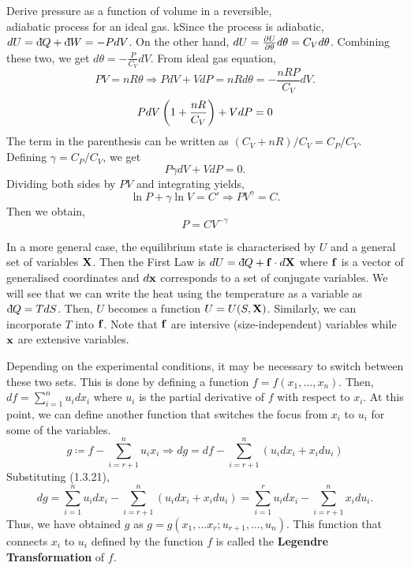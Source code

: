         \begin{problem}{Derive pressure as a function of volume in a reversible, \\adiabatic process for an ideal gas.}
            kSince the process is adiabatic, $dU = \text{d}\hspace*{-0.13em}\bar{}\hspace*{0.1em} Q + \text{d}\hspace*{-0.13em}\bar{}\hspace*{0.1em} W = -PdV$.
            On the other hand, $dU = \frac{\partial U}{\partial \theta}d\theta = C_Vd\theta$. Combining these two, we get $d\theta = - \frac{P}{C_V}dV$. From ideal gas equation,
            \begin{equation}
                PV = nR\theta \Rightarrow PdV + VdP = nRd\theta = -\frac{nRP}{C_V}dV.
            \end{equation}
            \begin{equation}
                PdV\left( 1+\frac{nR}{C_V} \right) + VdP = 0
            \end{equation}
            The term in the parenthesis can be written as $(C_V+nR)/C_V = C_P/C_V$. Defining $\gamma = C_P/C_V$, we get
            \begin{equation}
                P\gamma dV + VdP = 0.
            \end{equation}
            Dividing both sides by $PV$ and integrating yields,
            \begin{equation}
                \ln P + \gamma\ln V = C' \Rightarrow PV^\gamma = C.
            \end{equation}
            Then we obtain,
            \begin{equation}
                \boxed{P = CV^{-\gamma}}
            \end{equation}
        \end{problem}
    In a more general case, the equilibrium state is characterised by $U$ and a general set of variables $\mathbf{X}$. Then the First Law is $dU = \text{d}\hspace*{-0.13em}\bar{}\hspace*{0.1em} Q + \mathbf{f}\cdot d\mathbf{X}$ where $\mathbf{f}$ is a vector of generalised coordinates and $d\mathbf{x}$ corresponds to a set of conjugate variables. We will see that we can write the heat using the temperature as a variable as $\text{d}\hspace*{-0.13em}\bar{}\hspace*{0.1em} Q = TdS$. Then, $U$ becomes a function $U=U(S,\mathbf{X})$. Similarly, we can incorporate $T$ into $\mathbf{f}$. Note that $\mathbf{f}$ are intersive (size-independent) variables while $\mathbf{x}$ are extensive variables. 

    Depending on the experimental conditions, it may be necessary to switch between these two sets. This is done by defining a function $f=f(x_1,...,x_n)$. Then, $df = \sum_{i=1}^nu_idx_i$ where $u_i$ is the partial derivative of $f$ with respect to $x_i$. At this point, we can define another function that switches the focus from $x_i$ to $u_i$ for some of the variables.
        \begin{equation}
            g \coloneqq f-\sum_{i=r+1}^nu_ix_i \Rightarrow dg = df-\sum_{i=r+1}^n(u_idx_i+x_idu_i)
        \end{equation}
        Substituting (1.3.21),
        \begin{equation}
            dg = \sum_{i=1}^n u_idx_i - \sum_{i=r+1}^n(u_idx_i+x_idu_i) = \sum_{i=1}^ru_idx_i-\sum_{i=r+1}^nx_idu_i.
        \end{equation}
        Thus, we have obtained $g$ as $g=g(x_1,...x_r;u_{r+1},...,u_n)$. This function that connects $x_i$ to $u_i$ defined by the function $f$ is called the \textbf{Legendre Transformation} of $f$.
